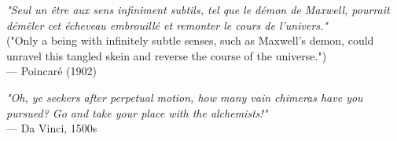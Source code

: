 \begin{flushright}
\emph{"Seul un être aux sens infiniment subtils, tel que le démon de Maxwell, pourrait démêler cet écheveau embrouillé et remonter le cours de l’univers."} \\  
("Only a being with infinitely subtle senses, such as Maxwell’s demon, could unravel this tangled skein and reverse the course of the universe.") \\
 — Poincaré (1902)
\end{flushright}

\begin{flushright}
    \emph{"Oh, ye seekers after perpetual motion, how many vain chimeras have you pursued? Go and take your place with the alchemists!"} \\
    — Da Vinci, 1500s
\end{flushright}
